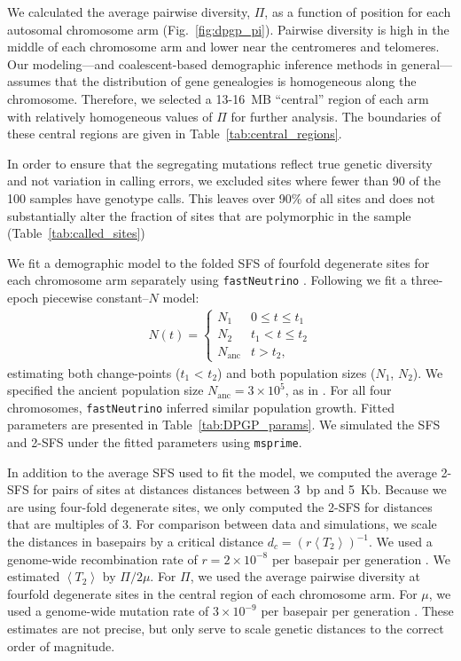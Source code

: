 \documentclass[11pt, letterpaper]{article}   	%
\newcommand{\fig}[1]{Fig.~\ref{#1}}
\newcommand{\E}[1]{\left< #1 \right>}
\begin{document}
We calculated the average pairwise diversity, $\Pi$, as a function of position for each autosomal chromosome arm (\fig{fig:dpgp_pi}).
Pairwise diversity is high in the middle of each chromosome arm and lower near the centromeres and telomeres.
Our modeling---and coalescent-based demographic inference methods in general---assumes that the distribution of gene genealogies is homogeneous along the chromosome.
Therefore, we selected a 13-16~MB ``central'' region of each arm with relatively homogeneous values of $\Pi$ for further analysis.
The boundaries of these central regions are given in Table~\ref{tab:central_regions}.

In order to ensure that the segregating mutations reflect true genetic diversity and not variation in calling errors, we excluded sites where fewer than 90 of the 100 samples have genotype calls.
This leaves over 90\% of all sites and does not substantially alter the fraction of sites that are polymorphic in the sample (Table~\ref{tab:called_sites})

We fit a demographic model to the folded SFS of fourfold degenerate sites for each chromosome arm separately using \texttt{fastNeutrino} \autocite{BhaskarEtAl2015}.
Following \cite{RagsdaleGutenkunst2017} we fit a three-epoch piecewise constant--$N$ model:
\begin{align}
    N(t) = \begin{cases}
                N_1 & 0 \leq t \leq t_1 \\
                N_2 & t_1 <  t \leq t_2 \\
                N_{\text{anc}} & t > t_2,
            \end{cases}
    \label{eq:piecewise}
\end{align}
estimating both change-points ($t_1$ < $t_2$) and both population sizes ($N_1$, $N_2$).
We specified the ancient population size $N_{\text{anc}} = 3\times 10^5$, as in \cite{RagsdaleGutenkunst2017}.
For all four chromosomes, \texttt{fastNeutrino} inferred similar population growth.
Fitted parameters are presented in Table~\ref{tab:DPGP_params}.
We simulated the SFS and 2-SFS under the fitted parameters using \texttt{msprime}.

In addition to the average SFS used to fit the model, we computed the average 2-SFS for pairs of sites at distances distances between 3~bp and 5~Kb.
Because we are using four-fold degenerate sites, we only computed the 2-SFS for distances that are multiples of 3.
For comparison between data and simulations, we scale the distances in basepairs by a critical distance $d_c = (r\E{T_2})^{-1}$.
We used a genome-wide recombination rate of $r = 2 \times 10^{-8}$ per basepair per generation \autocite{ComeronEtAl2012}.
We estimated $\E{T_2}$ by $\Pi / 2 \mu$.
For $\Pi$, we used the average pairwise diversity at fourfold degenerate sites in the central region of each chromosome arm.
For $\mu$, we used a genome-wide mutation rate of $3 \times 10^{-9}$ per basepair per generation \autocite{KeightlyEtAl2014}.
These estimates are not precise, but only serve to scale genetic distances to the correct order of magnitude.
\end{document}
